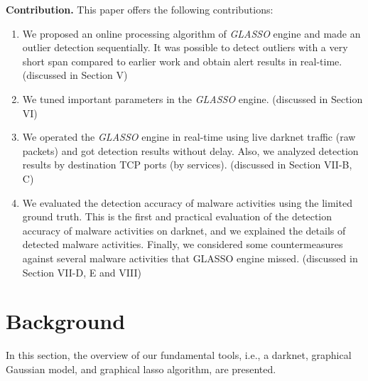 \documentclass[conference]{IEEEtran}
\begin{document}
\noindent
\textbf{Contribution.}\space\space
This paper offers the following contributions:
\begin{enumerate}
	\item We proposed an online processing algorithm of {\it GLASSO} engine and made an outlier detection sequentially.
  It was possible to detect outliers with a very short span compared to earlier work and obtain alert results in real-time. (discussed in Section V)
	\item We tuned important parameters in the {\it GLASSO} engine. (discussed in Section V\hspace{-.1em}I)
	\item We operated the {\it GLASSO} engine in real-time using live darknet traffic (raw packets) and got detection results without delay.
  Also, we analyzed detection results by destination TCP ports (by services). (discussed in Section V\hspace{-.1em}I\hspace{-.1em}I-B, C)
  \item We evaluated the detection accuracy of malware activities using the limited ground truth.
  This is the first and practical evaluation of the detection accuracy of malware activities on darknet, and we explained the details of detected malware activities.
  Finally, we considered some countermeasures against several malware activities that GLASSO engine missed. (discussed in Section V\hspace{-.1em}I\hspace{-.1em}I-D, E and V\hspace{-.1em}I\hspace{-.1em}I\hspace{-.1em}I)
\end{enumerate}



\section{Background}
In this section, the overview of our fundamental tools, i.e., a darknet, graphical Gaussian model, and graphical lasso algorithm, are presented.
\end{document}
